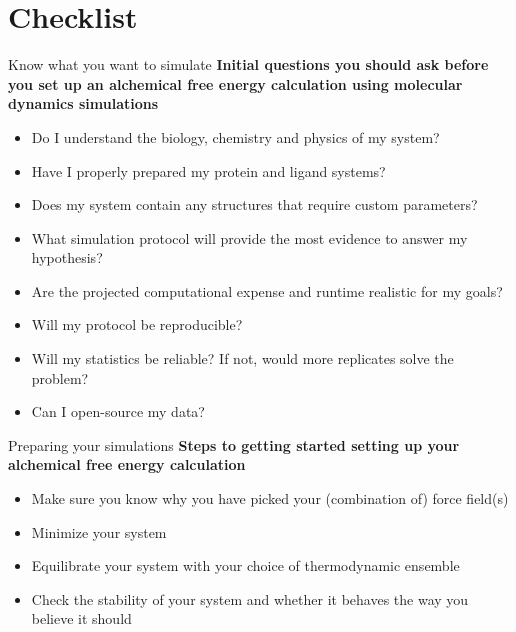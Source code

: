 \documentclass[9pt,bestpractices]{livecoms}
\begin{document}
\clearpage

\clearpage

\section{Checklist}
\label{sec:checklist}
\begin{Checklists*}[p!]
\begin{checklist}{ Know what you want to simulate}
    \textbf{Initial questions you should ask before you set up an alchemical free energy calculation using molecular dynamics simulations}
\begin{itemize}
    \item Do I understand the biology, chemistry and physics of my system?
    \item Have I properly prepared my protein and ligand systems?
    \item Does my system contain any structures that require custom parameters?
    \item What simulation protocol will provide the most evidence to answer my hypothesis?
    \item Are the projected computational expense and runtime realistic for my goals?
    \item Will my protocol be reproducible? 
    \item Will my statistics be reliable? If not, would more replicates solve the problem? 
    \item Can I open-source my data?
\end{itemize}
\end{checklist}

\begin{checklist}{Preparing your simulations}
\textbf{Steps to getting started setting up your alchemical free energy calculation}
\begin{itemize}
    \item Make sure you know why you have picked your (combination of) force field(s)
    \item Minimize your system
    \item Equilibrate your system with your choice of thermodynamic ensemble
    \item Check the stability of your system and whether it behaves the way you believe it should
\end{itemize}
\end{checklist}


\end{Checklists*}
\end{document}
